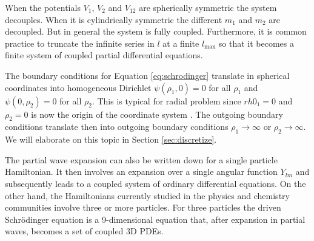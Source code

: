 \documentclass[mathpazo]{cicp}
\theoremstyle{definition}
\numberwithin{equation}{section}
\providecommand{\wv}{}
\providecommand{\hbz}{}
\begin{document}
When the potentials $V_1$, $V_2$ and $V_{12}$ are spherical\hbz{ly} symmetric
the system decouples. When it is c\hbz{y}lindrical\hbz{ly} symmetric the different
$m_1$ and $m_2$ are decoupled. \wv{But in general the system is fully coupled.} Furthermore, it is common practice to
truncate the infinite series in $l$ at a finite $l_\text{max}$ so that it
becomes a finite system of coupled partial differential equations.


\wv{ The boundary conditions \hbz{for Equation} \eqref{eq:schrodinger} translate in spherical coordinates into
  homogeneous Dirichlet $\psi(\rho_1,0)=0$ for all $\rho_1$ and
  $\psi(0,\rho_2)=0$ for all $\rho_2$.  \wv{This is typical for radial problem since $rh0_1=0$ and $\rho_2=0$ is now the origin of the coordinate system \cite{arfken}.} The outgoing boundary conditions
  translate then into outgoing boundary conditions $\rho_1 \rightarrow
  \infty$ or $\rho_2 \rightarrow \infty$. We will \hbz{elaborate on this
  topic in Section \ref{sec:discretize}}.}

\wv{The partial wave expansion can also be written down for a single
  particle Hamiltonian. It then involves an expansion over \hbz{a} single
  angular function $Y_{lm}$ \hbz{and subsequently} leads to a coupled system of
  ordinary differential equations. On the other hand, the Hamiltonians
   currently studied in the physics and chemistry communit\hbz{ies involve}
  three or more particles.  For three particles the driven
  Schr\"odinger equation is a 9-dimensional equation that, after
  expansion in partial waves, becomes a set of coupled 3D PDEs.}
\end{document}
